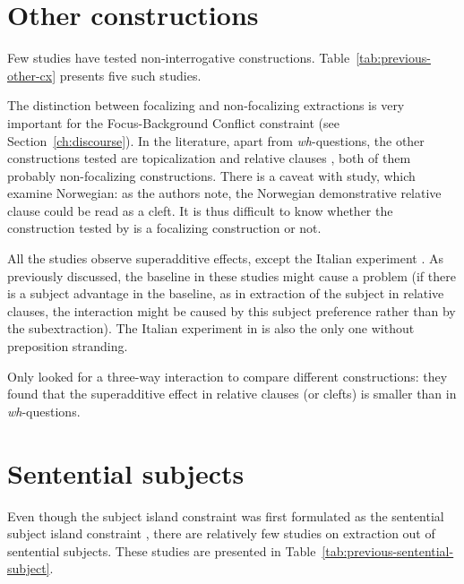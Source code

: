 {\tiny}

\section{Other constructions}

Few studies have tested non-interrogative constructions. Table~\ref{tab:previous-other-cx} presents five such studies.

The distinction between focalizing and non-focalizing extractions is very important for the Focus-Background Conflict constraint (see Section~\ref{ch:discourse}). In the literature, apart from \textit{wh}-questions, the other constructions tested are topicalization \citep{Kush.2019} and relative clauses \citep{Sprouse.2016,Kobzeva.2022}, both of them probably non-focalizing constructions. There is a caveat with  study, which examine Norwegian: as the authors note, the Norwegian demonstrative relative clause could be read as a cleft. It is thus difficult to know whether the construction tested by \citeauthor{Kobzeva.2022} is a focalizing construction or not. 

All the studies observe superadditive effects, except the Italian experiment \citep{Sprouse.2016}. As previously discussed, the baseline in these studies might cause a problem (if there is a subject advantage in the baseline, as in extraction of the subject in relative clauses, the interaction might be caused by this subject preference rather than by the subextraction). The Italian experiment in \citep{Sprouse.2016} is also the only one without preposition stranding. 

Only \citet{Kobzeva.2022} looked for a three-way interaction to compare different constructions: they found that the superadditive effect in relative clauses (or clefts) is smaller than in \textit{wh}-questions.

\section{Sentential subjects}

Even though the subject island constraint was first formulated as the sentential subject island constraint \citep{Ross.1967}, there are relatively few studies on extraction out of sentential subjects. These studies are presented in Table~\ref{tab:previous-sentential-subject}.

